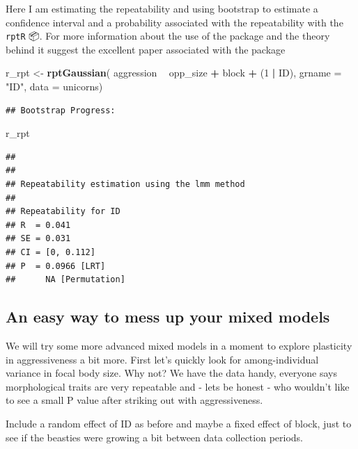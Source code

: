 \documentclass[
  12pt,
]{book}
\newenvironment{Shaded}{\begin{snugshade}}{\end{snugshade}}
\newcommand{\DataTypeTok}[1]{\textcolor[rgb]{0.13,0.29,0.53}{#1}}
\newcommand{\DecValTok}[1]{\textcolor[rgb]{0.00,0.00,0.81}{#1}}
\newcommand{\KeywordTok}[1]{\textcolor[rgb]{0.13,0.29,0.53}{\textbf{#1}}}
\newcommand{\NormalTok}[1]{#1}
\newcommand{\OperatorTok}[1]{\textcolor[rgb]{0.81,0.36,0.00}{\textbf{#1}}}
\newcommand{\StringTok}[1]{\textcolor[rgb]{0.31,0.60,0.02}{#1}}
\begin{document}
Here I am estimating the repeatability and using bootstrap to estimate a confidence interval and a probability associated with the repeatability with the \texttt{rptR} 📦. For more information about the use of the package and the theory behind it suggest the excellent paper associated with the package \citep{rptR2017}

\begin{Shaded}
\begin{Highlighting}[]
\NormalTok{r_rpt <-}\StringTok{ }\KeywordTok{rptGaussian}\NormalTok{(}
\NormalTok{  aggression }\OperatorTok{~}\StringTok{ }\NormalTok{opp_size }\OperatorTok{+}\StringTok{ }\NormalTok{block }\OperatorTok{+}\StringTok{ }\NormalTok{(}\DecValTok{1} \OperatorTok{|}\StringTok{ }\NormalTok{ID),}
  \DataTypeTok{grname =} \StringTok{"ID"}\NormalTok{, }\DataTypeTok{data =}\NormalTok{ unicorns)}
\end{Highlighting}
\end{Shaded}

\begin{verbatim}
## Bootstrap Progress:
\end{verbatim}

\begin{Shaded}
\begin{Highlighting}[]
\NormalTok{r_rpt}
\end{Highlighting}
\end{Shaded}

\begin{verbatim}
## 
## 
## Repeatability estimation using the lmm method 
## 
## Repeatability for ID
## R  = 0.041
## SE = 0.031
## CI = [0, 0.112]
## P  = 0.0966 [LRT]
##      NA [Permutation]
\end{verbatim}

\hypertarget{an-easy-way-to-mess-up-your-mixed-models}{%
\subsection{An easy way to mess up your mixed models}\label{an-easy-way-to-mess-up-your-mixed-models}}

We will try some more advanced mixed models in a moment to explore plasticity in aggressiveness a bit more. First let's quickly look for among-individual variance in focal body size. Why not? We have the data handy, everyone says morphological traits are very repeatable and - lets be honest - who wouldn't like to see a small P value after striking out with aggressiveness.

Include a random effect of ID as before and maybe a fixed effect of block, just to see if the beasties were growing a bit between data collection periods.
\end{document}
